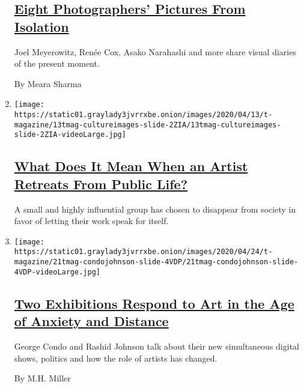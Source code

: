 \begin{enumerate}
  \hypertarget{eight-photographers-pictures-from-isolation}{%
  \subsection{\texorpdfstring{\href{/2020/04/29/t-magazine/photographers-coronavirus-isolation.html}{Eight
  Photographers' Pictures From
  Isolation}}{Eight Photographers' Pictures From Isolation}}\label{eight-photographers-pictures-from-isolation}}

  Joel Meyerowitz, Renée Cox, Asako Narahashi and more share visual
  diaries of the present moment.

  By Meara Sharma
\item
  \texttt{[image: https://static01.graylady3jvrrxbe.onion/images/2020/04/13/t-magazine/13tmag-cultureimages-slide-2ZIA/13tmag-cultureimages-slide-2ZIA-videoLarge.jpg]}

  \hypertarget{what-does-it-mean-when-an-artist-retreats-from-public-life}{%
  \subsection{\texorpdfstring{\href{/interactive/2020/04/13/t-magazine/artist-recluse.html}{What
  Does It Mean When an Artist Retreats From Public
  Life?}}{What Does It Mean When an Artist Retreats From Public Life?}}\label{what-does-it-mean-when-an-artist-retreats-from-public-life}}

  A small and highly influential group has chosen to disappear from
  society in favor of letting their work speak for itself.
\item
  \texttt{[image: https://static01.graylady3jvrrxbe.onion/images/2020/04/24/t-magazine/21tmag-condojohnson-slide-4VDP/21tmag-condojohnson-slide-4VDP-videoLarge.jpg]}

  \hypertarget{two-exhibitions-respond-to-art-in-the-age-of-anxiety-and-distance}{%
  \subsection{\texorpdfstring{\href{/2020/04/24/t-magazine/george-condo-rashid-johnson-art.html}{Two
  Exhibitions Respond to Art in the Age of Anxiety and
  Distance}}{Two Exhibitions Respond to Art in the Age of Anxiety and Distance}}\label{two-exhibitions-respond-to-art-in-the-age-of-anxiety-and-distance}}

  George Condo and Rashid Johnson talk about their new simultaneous
  digital shows, politics and how the role of artists has changed.

  By M.H. Miller
\end{enumerate}

